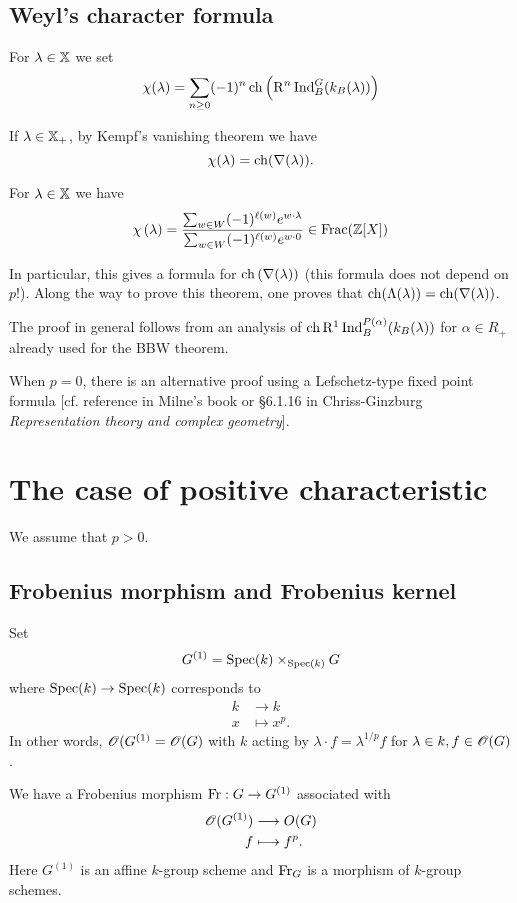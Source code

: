	\subsection{Weyl's character formula}
	For $\lambda\in \mathbb{X}$ we set
	\[
		\chi(\lambda) = \sum_{n\ge 0}(-1)^{n}\operatorname{ch}\left( \mathrm{R}^{n}\operatorname{Ind}_B^{G}(k_B(\lambda)) \right)
	\]
	\begin{note}
		If $\lambda\in \mathbb{X}_+$, by Kempf's vanishing theorem we have
		\[
			\chi(\lambda) = \operatorname{ch}(\nabla(\lambda)).
		\]
	\end{note}
	\begin{theorem}
		For $\lambda\in \mathbb{X}$ we have
		\[
			\chi\left( \lambda \right) = \frac{\sum_{w\in W}(-1)^{\ell(w)}e^{w\cdot
			\lambda}}{\sum_{w\in W}(-1)^{\ell(w)}e^{w\cdot 0}} \in \operatorname{Frac}(\mathbb Z[X])
		\]
	\end{theorem}
	In particular, this gives a formula for $\operatorname{ch}\left( \nabla(\lambda) \right) $ (this
	formula does not depend on $p$!). Along the way to prove this theorem, one proves that
	$\operatorname{ch}(\Lambda(\lambda)) = \operatorname{ch}(\nabla(\lambda))$.

	\begin{remark}
		The proof in general follows from an analysis of
		$\operatorname{ch}\mathrm{R}^{1}\operatorname{Ind}_B^{P(\alpha)}(k_B(\lambda))$ for $\alpha\in R_+$ already used for the BBW theorem.

		When $p=0$, there is an alternative proof using a Lefschetz-type fixed point formula
		[cf. reference in Milne's book or §6.1.16 in Chriss-Ginzburg \emph{Representation
		theory and complex geometry}].
	\end{remark}

	\section{The case of positive characteristic}
	We assume that $p>0$.
	\subsection{Frobenius morphism and Frobenius kernel}
	Set
	\[
		G^{(1)} = \operatorname{Spec}(k)\times_{\operatorname{Spec}(k)} G
	\]
	where $\Spec(k)\to \Spec(k)$ corresponds to
	\begin{align*}
		k &\longrightarrow k \\
		x &\longmapsto x^{p}.
	\end{align*}
	In other words, $\mathscr{O}(G^{(1)}=\mathscr{O}(G)$ with $k$ acting by $\lambda\cdot f = \lambda^{1
		/p}f$ for $\lambda\in k, f\in \mathscr{O}(G)$.

		We have a Frobenius morphism $\Fr:G\to G^{(1)}$ associated with
		\begin{align*}
			\mathscr{O}(G^{(1)}) &\longrightarrow O(G) \\
			f &\longmapsto f^{p}.
		\end{align*}
		Here $G^{(1)}$ is an affine $k$-group scheme and $\operatorname{Fr}_G$ is a morphism of $k$-group schemes.

